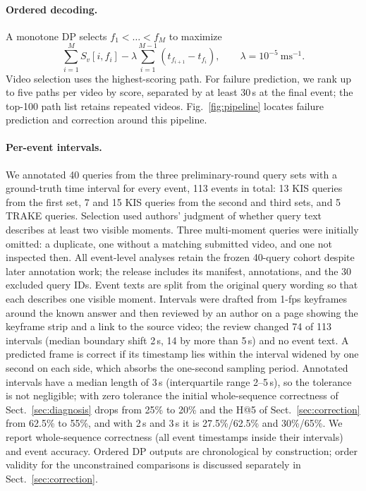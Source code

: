 \paragraph{Ordered decoding.}
A monotone DP selects $f_1<\dots<f_M$ to maximize
\begin{equation}
\sum_{i=1}^{M} S_v[i,f_i]-\lambda\sum_{i=1}^{M-1}(t_{f_{i+1}}-t_{f_i}),
\qquad \lambda=10^{-5}\ \mathrm{ms}^{-1}.
\label{eq:decoding}
\end{equation}
Video selection uses the highest-scoring path.
For failure prediction, we rank up to five paths per video by score, separated by at least 30\,s at the final event; the top-100 path list retains repeated videos.
Fig.~\ref{fig:pipeline} locates failure prediction and correction around this pipeline.



\paragraph{Per-event intervals.}
We annotated 40 queries from the three preliminary-round query sets with a ground-truth time interval for every event, 113 events in total: 13 KIS queries from the first set, 7 and 15 KIS queries from the second and third sets, and 5 TRAKE queries.
Selection used authors' judgment of whether query text describes at least two visible moments.
Three multi-moment queries were initially omitted: a duplicate, one without a matching submitted video, and one not inspected then.
All event-level analyses retain the frozen 40-query cohort despite later annotation work; the release includes its manifest, annotations, and the 30 excluded query IDs.
Event texts are split from the original query wording so that each describes one visible moment.
Intervals were drafted from 1-fps keyframes around the known answer and then reviewed by an author on a page showing the keyframe strip and a link to the source video; the review changed 74 of 113 intervals (median boundary shift 2\,s, 14 by more than 5\,s) and no event text.
A predicted frame is correct if its timestamp lies within the interval widened by one second on each side, which absorbs the one-second sampling period.
Annotated intervals have a median length of 3\,s (interquartile range 2--5\,s), so the tolerance is not negligible; with zero tolerance the initial whole-sequence correctness of Sect.~\ref{sec:diagnosis} drops from 25\% to 20\% and the H@5 of Sect.~\ref{sec:correction} from 62.5\% to 55\%, and with 2\,s and 3\,s it is 27.5\%/62.5\% and 30\%/65\%.
We report whole-sequence correctness (all event timestamps inside their intervals) and event accuracy.
Ordered DP outputs are chronological by construction; order validity for the unconstrained comparisons is discussed separately in Sect.~\ref{sec:correction}.

